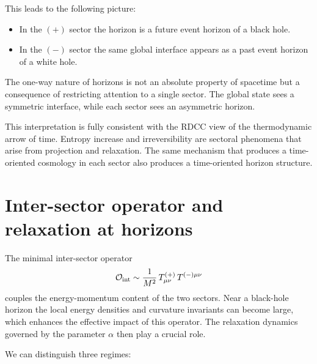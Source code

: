 \documentclass[11pt,a4paper]{article}
\begin{document}
This leads to the following picture:
\begin{itemize}
    \item In the \((+)\) sector the horizon is a future event horizon of a black hole.
    \item In the \((-)\) sector the same global interface appears as a past event horizon of a white hole.
\end{itemize}

The one-way nature of horizons is not an absolute property of spacetime but a consequence of 
restricting attention to a single sector. The global state sees a symmetric interface, while each 
sector sees an asymmetric horizon.

This interpretation is fully consistent with the RDCC view of the thermodynamic arrow of time. 
Entropy increase and irreversibility are sectoral phenomena that arise from projection and relaxation. 
The same mechanism that produces a time-oriented cosmology in each sector also produces a 
time-oriented horizon structure.


\section{Inter-sector operator and relaxation at horizons}

The minimal inter-sector operator
\begin{equation}
\mathcal{O}_{\rm int} \sim \frac{1}{M^{2}} \, 
T^{(+)}_{\mu\nu} \, T^{(-)\mu\nu}
\end{equation}
couples the energy-momentum content of the two sectors. 
Near a black-hole horizon the local energy densities and curvature invariants can become large, 
which enhances the effective impact of this operator. 
The relaxation dynamics governed by the parameter \(\alpha\) then play a crucial role.

We can distinguish three regimes:
\end{document}
